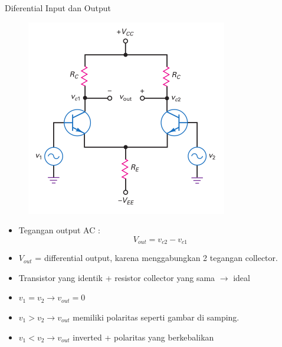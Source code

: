 \documentclass[aspectratio=169]{beamer}
\begin{document}
\begin{frame}{Diferential Input dan Output}
	\begin{multicols}{2}
		\begin{figure}
			\centering
			\includegraphics[height=0.7\textheight]{gambar/01.differential_input_output}
		\end{figure}
		\columnbreak
		\begin{itemize}
			\item Tegangan output AC :\\
			
			\begin{equation} \label{pers.1}
				V_{out} =  v_{c2} - v_{c1}
			\end{equation}
		
			\item $ V_{out} $ = differential output, karena menggabungkan 2 tegangan collector.
			\item Transistor yang identik + resistor collector yang sama $ \rightarrow $ ideal
			\item $ v_1 = v_2 \rightarrow v_{out} = 0 $
			\item $ v_1 > v_2 \rightarrow v_{out} $ memiliki polaritas seperti gambar di samping.
			\item $ v_1 < v_2 \rightarrow v_{out} $ inverted + polaritas yang berkebalikan
		\end{itemize}
	\end{multicols}
\end{frame}
\end{document}
